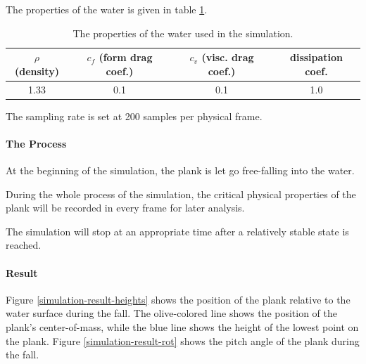 The properties of the water is given in table \ref{simulation-water-properties}.

\begin{table}[h]
	\centering
	\begin{tabular}{ c c c c }
		\hline
		$\rho$ {\footnotesize(density)} & $c_f$ {\footnotesize(form drag coef.)} & $c_v$ {\footnotesize(visc. drag coef.)} & {\small dissipation coef.} \\
		\hline
		1.33 & 0.1 & 0.1 & 1.0 \\
		\hline
	\end{tabular}
	\caption{The properties of the water used in the simulation.}
	\label{simulation-water-properties}
\end{table}

The sampling rate is set at 200 samples per physical frame.

\paragraph{The Process}

At the beginning of the simulation, the plank is let go free-falling into the water.

During the whole process of the simulation, the critical physical properties of the plank will be recorded in every frame for later analysis.

The simulation will stop at an appropriate time after a relatively stable state is reached.

\paragraph{Result}

Figure \ref{simulation-result-heights} shows the position of the plank relative to the water surface during the fall.
The olive-colored line shows the position of the plank's center-of-mass, while the blue line shows the height of the lowest point on the plank.
Figure \ref{simulation-result-rot} shows the pitch angle of the plank during the fall.

